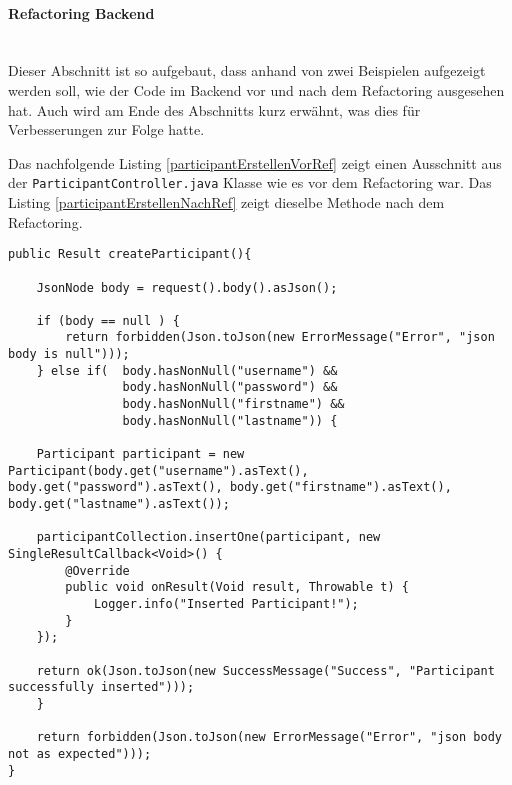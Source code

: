 \paragraph*{Refactoring Backend}~\\
Dieser Abschnitt ist so aufgebaut, dass anhand von zwei Beispielen aufgezeigt werden soll, wie der Code im Backend vor und nach dem Refactoring ausgesehen hat. Auch wird am Ende des Abschnitts kurz erwähnt, was dies für Verbesserungen zur Folge hatte.

Das nachfolgende Listing \ref{participantErstellenVorRef} zeigt einen Ausschnitt aus der \texttt{Participant\-Controller\-.java} Klasse wie es vor dem Refactoring war. Das Listing \ref{participantErstellenNachRef} zeigt dieselbe Methode nach dem Refactoring.

\lstset{language=JAVA, showstringspaces=false, frame=single, captionpos=b, label=createParticipant, breaklines=true, numbers=left}
\begin{lstlisting}[caption={Participant erstellen vor Refactoring}, label=participantErstellenVorRef]
public Result createParticipant(){

    JsonNode body = request().body().asJson();

    if (body == null ) {
        return forbidden(Json.toJson(new ErrorMessage("Error", "json body is null")));
    } else if(  body.hasNonNull("username") &&
            	body.hasNonNull("password") &&
            	body.hasNonNull("firstname") &&
            	body.hasNonNull("lastname")) {

    Participant participant = new Participant(body.get("username").asText(), body.get("password").asText(), body.get("firstname").asText(), body.get("lastname").asText());

    participantCollection.insertOne(participant, new SingleResultCallback<Void>() {
        @Override
        public void onResult(Void result, Throwable t) {
            Logger.info("Inserted Participant!");
        }
    });

    return ok(Json.toJson(new SuccessMessage("Success", "Participant successfully inserted")));
    }

    return forbidden(Json.toJson(new ErrorMessage("Error", "json body not as expected")));
}
\end{lstlisting}

